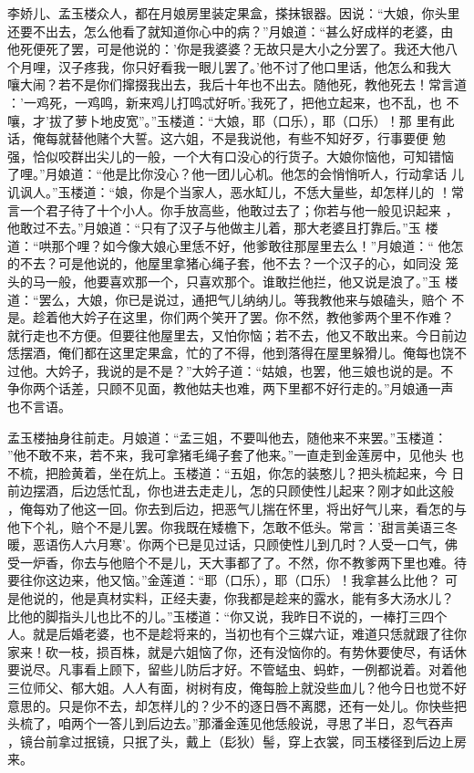 李娇儿、孟玉楼众人，都在月娘房里装定果盒，搽抹银器。因说：“大娘，你头里
还要不出去，怎么他看了就知道你心中的病？”月娘道：“甚么好成样的老婆，由
他死便死了罢，可是他说的：'你是我婆婆？无故只是大小之分罢了。我还大他八
个月哩，汉子疼我，你只好看我一眼儿罢了。'他不讨了他口里话，他怎么和我大
嚷大闹？若不是你们撺掇我出去，我后十年也不出去。随他死，教他死去！常言道
：'一鸡死，一鸡鸣，新来鸡儿打鸣忒好听。'我死了，把他立起来，也不乱，也
不嚷，才'拔了萝卜地皮宽”。”玉楼道：“大娘，耶（口乐），耶（口乐）！那
里有此话，俺每就替他赌个大誓。这六姐，不是我说他，有些不知好歹，行事要便
勉强，恰似咬群出尖儿的一般，一个大有口没心的行货子。大娘你恼他，可知错恼
了哩。”月娘道：“他是比你没心？他一团儿心机。他怎的会悄悄听人，行动拿话
儿讥讽人。”玉楼道：“娘，你是个当家人，恶水缸儿，不恁大量些，却怎样儿的
！常言一个君子待了十个小人。你手放高些，他敢过去了；你若与他一般见识起来
，他敢过不去。”月娘道：“只有了汉子与他做主儿着，那大老婆且打靠后。”玉
楼道：“哄那个哩？如今像大娘心里恁不好，他爹敢往那屋里去么！”月娘道：“
他怎的不去？可是他说的，他屋里拿猪心绳子套，他不去？一个汉子的心，如同没
笼头的马一般，他要喜欢那一个，只喜欢那个。谁敢拦他拦，他又说是浪了。”玉
楼道：“罢么，大娘，你已是说过，通把气儿纳纳儿。等我教他来与娘磕头，赔个
不是。趁着他大妗子在这里，你们两个笑开了罢。你不然，教他爹两个里不作难？
就行走也不方便。但要往他屋里去，又怕你恼；若不去，他又不敢出来。今日前边
恁摆酒，俺们都在这里定果盒，忙的了不得，他到落得在屋里躲猾儿。俺每也饶不
过他。大妗子，我说的是不是？”大妗子道：“姑娘，也罢，他三娘也说的是。不
争你两个话差，只顾不见面，教他姑夫也难，两下里都不好行走的。”月娘通一声
也不言语。

孟玉楼抽身往前走。月娘道：“孟三姐，不要叫他去，随他来不来罢。”玉楼道：
”他不敢不来，若不来，我可拿猪毛绳子套了他来。”一直走到金莲房中，见他头
也不梳，把脸黄着，坐在炕上。玉楼道：“五姐，你怎的装憨儿？把头梳起来，今
日前边摆酒，后边恁忙乱，你也进去走走儿，怎的只顾使性儿起来？刚才如此这般
，俺每劝了他这一回。你去到后边，把恶气儿揣在怀里，将出好气儿来，看怎的与
他下个礼，赔个不是儿罢。你我既在矮檐下，怎敢不低头。常言：'甜言美语三冬
暖，恶语伤人六月寒'。你两个已是见过话，只顾使性儿到几时？人受一口气，佛
受一炉香，你去与他赔个不是儿，天大事都了了。不然，你不教爹两下里也难。待
要往你这边来，他又恼。”金莲道：“耶（口乐），耶（口乐）！我拿甚么比他？
可是他说的，他是真材实料，正经夫妻，你我都是趁来的露水，能有多大汤水儿？
比他的脚指头儿也比不的儿。”玉楼道：“你又说，我昨日不说的，一棒打三四个
人。就是后婚老婆，也不是趁将来的，当初也有个三媒六证，难道只恁就跟了往你
家来！砍一枝，损百株，就是六姐恼了你，还有没恼你的。有势休要使尽，有话休
要说尽。凡事看上顾下，留些儿防后才好。不管蜢虫、蚂蚱，一例都说着。对着他
三位师父、郁大姐。人人有面，树树有皮，俺每脸上就没些血儿？他今日也觉不好
意思的。只是你不去，却怎样儿的？少不的逐日唇不离腮，还有一处儿。你快些把
头梳了，咱两个一答儿到后边去。”那潘金莲见他恁般说，寻思了半日，忍气吞声
，镜台前拿过抿镜，只抿了头，戴上（髟狄）髻，穿上衣裳，同玉楼径到后边上房
来。


